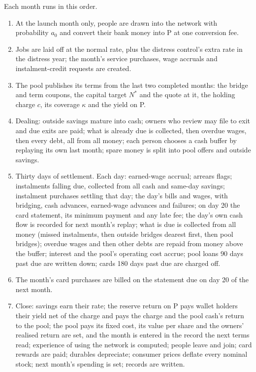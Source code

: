 Each month runs in this order.
\begin{enumerate}[leftmargin=*,itemsep=1pt]
\item At the launch month only, people are drawn into the network with probability $a_{0}$ and convert their bank
money into P at one conversion fee.
\item Jobs are laid off at the normal rate, plus the distress control's extra rate in the distress year; the month's
service purchases, wage accruals and instalment-credit requests are created.
\item The pool publishes its terms from the last two completed months: the bridge and term coupons, the capital
target $N^{*}$ and the quote at it, the holding charge $c$, its coverage $\kappa$ and the yield on P.
\item Dealing: outside savings mature into cash; owners who review may file to exit and due exits are paid; what is
already due is collected, then overdue wages, then every debt, all from all money; each person chooses a cash buffer
by replaying its own last month; spare money is split into pool offers and outside savings.
\item Thirty days of settlement. Each day: earned-wage accrual; arrears flags; instalments falling due, collected
from all cash and same-day savings; instalment purchases settling that day; the day's bills and wages, with
bridging, cash advances, earned-wage advances and failures; on day 20 the card statement, its minimum payment and
any late fee; the day's own cash flow is recorded for next month's replay; what is due is collected from all money
(missed instalments, then outside bridges dearest first, then pool bridges); overdue wages and then other debts are
repaid from money above the buffer; interest and the pool's operating cost accrue; pool loans 90 days past due are
written down; cards 180 days past due are charged off.
\item The month's card purchases are billed on the statement due on day 20 of the next month.
\item Close: savings earn their rate; the reserve return on P pays wallet holders their yield net of the charge and
pays the charge and the pool cash's return to the pool; the pool pays its fixed cost, its value per share and the
owners' realised return are set, and the month is entered in the record the next terms read; experience of using
the network is computed; people leave and join; card rewards are paid; durables depreciate; consumer prices deflate
every nominal stock; next month's spending is set; records are written.
\end{enumerate}

